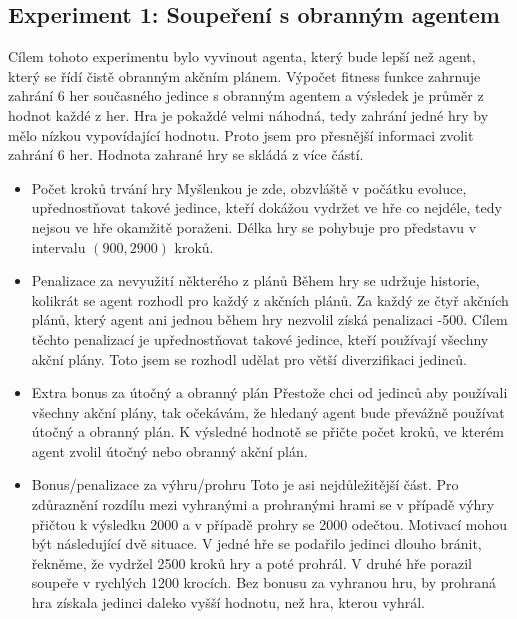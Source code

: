 \subsection{Experiment 1: Soupeření s obranným agentem}
Cílem tohoto experimentu bylo vyvinout agenta, který bude lepší než agent, který se řídí čistě obranným akčním plánem.
Výpočet fitness funkce zahrnuje zahrání 6 her současného jedince s obranným agentem a výsledek je průměr z hodnot každé z her.
Hra je pokaždé velmi náhodná, tedy zahrání jedné hry by mělo nízkou vypovídající hodnotu. Proto jsem pro přesnější informaci zvolit zahrání 6 her.
Hodnota zahrané hry se skládá z více částí.
\begin{itemize}
    \item Počet kroků trvání hry
        \newline
        Myšlenkou je zde, obzvláště v počátku evoluce, upřednostňovat takové jedince, kteří dokážou vydržet ve hře co nejdéle, tedy nejsou ve hře okamžitě poraženi.
        Délka hry se pohybuje pro představu v intervalu $(900,2900)$ kroků.
    \item Penalizace za nevyužití některého z plánů
        \newline
        Během hry se udržuje historie, kolikrát se agent rozhodl pro každý z akčních plánů.
        Za každý ze čtyř akčních plánů, který agent ani jednou během hry nezvolil získá penalizaci -500. Cílem těchto penalizací je upřednostňovat takové jedince, kteří používají všechny akční plány. 
        Toto jsem se rozhodl udělat pro větší diverzifikaci jedinců.
    \item Extra bonus za útočný a obranný plán 
        \newline
        Přestože chci od jedinců aby používali všechny akční plány, tak očekávám, že hledaný agent bude převážně používat útočný a obranný plán.
        K výsledné hodnotě se přičte počet kroků, ve kterém agent zvolil útočný nebo obranný akční plán.    
    \item Bonus/penalizace za výhru/prohru
        \newline
        Toto je asi nejdůležitější část. Pro zdůraznění rozdílu mezi vyhranými a prohranými hrami se v případě výhry přičtou k výsledku 2000 a v případě prohry se 2000 odečtou.
        Motivací mohou být následující dvě situace. V jedné hře se podařilo jedinci dlouho bránit, řekněme, že vydržel 2500 kroků hry a poté prohrál. V druhé hře porazil soupeře v rychlých 1200 krocích. 
        Bez bonusu za vyhranou hru, by prohraná hra získala jedinci daleko vyšší hodnotu, než hra, kterou vyhrál.        
    
\end{itemize}

